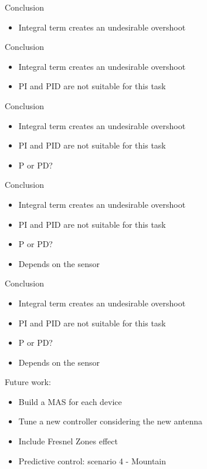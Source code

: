 \begin{frame}{Conclusion}{}
    \begin{itemize}
	  \item Integral term creates an undesirable overshoot
    \end{itemize}
\end{frame}


\begin{frame}{Conclusion}{}
    \begin{itemize}
	  \item Integral term creates an undesirable overshoot
	  \item PI and PID are not suitable for this task
    \end{itemize}
\end{frame}


\begin{frame}{Conclusion}{}
    \begin{itemize}
	  \item Integral term creates an undesirable overshoot
	  \item PI and PID are not suitable for this task
	  \item P or PD?
    \end{itemize}
\end{frame}

\begin{frame}{Conclusion}{}
    \begin{itemize}
	  \item Integral term creates an undesirable overshoot
	  \item PI and PID are not suitable for this task
	  \item P or PD?
	  \item Depends on the sensor
    \end{itemize}
\end{frame}


\begin{frame}{Conclusion}{}
    \begin{itemize}
	  \item Integral term creates an undesirable overshoot
	  \item PI and PID are not suitable for this task
	  \item P or PD?
	  \item Depends on the sensor
    \end{itemize}
  
  \begin{block}{Future work:}
    \begin{itemize}
	  \item Build a MAS for each device
	  \item Tune a new controller considering the new antenna
	  \item Include Fresnel Zones effect
	  \item Predictive control: scenario 4 - Mountain
    \end{itemize} 
  \end{block} 
  
\end{frame}